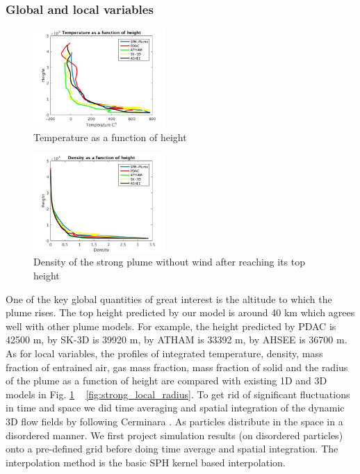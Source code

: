 \documentclass[journal abbreviation, manuscript]{copernicus}
\begin{document}
\subsubsection{Global and local variables}
\begin{figure}
\center
\includegraphics[width=5cm]{Temp}
\caption{Temperature as a function of height}
\label{fig:strong_local_temp}
\end{figure}
\begin{figure}
\center
\includegraphics[width=5cm]{density_strong}
\caption{Density of the strong plume without wind after reaching its top height}
\label{fig:strong_local_density}
\end{figure}
One of the key global quantities of great interest is the altitude to which the plume rises. The top height predicted by our model is around 40 km which agrees well with other plume models. For example, the height predicted by PDAC is 42500 m, by SK-3D is 39920 m, by ATHAM is 33392 m, by AHSEE is 36700 m. As for local variables, the profiles of integrated temperature, density, mass fraction of entrained air, gas mass fraction, mass fraction of solid and the radius of the plume as a function of height are compared with existing 1D and 3D models in Fig. \ref{fig:strong_local_temp} ~ \ref{fig:strong_local_radius}. To get rid of significant fluctuations in time and space we did time averaging and spatial integration of the dynamic 3D flow fields by following Cerminara \citep {cerminara2016large}.
As particles distribute in the space in a disordered manner. We first project simulation results (on disordered particles) onto a pre-defined grid before doing time average and spatial integration. The interpolation method is the basic SPH kernel based interpolation.\\
\end{document}
